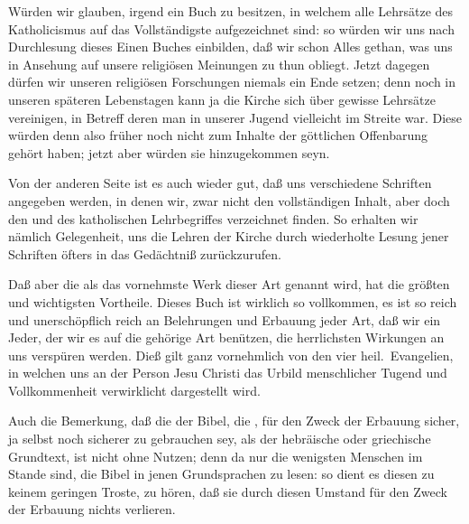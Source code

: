 \begin{aufza}
\item Würden wir glauben, irgend ein Buch zu besitzen, in welchem alle Lehrsätze des Katholicismus auf das Vollständigste aufgezeichnet sind: so würden wir uns nach Durchlesung dieses Einen Buches einbilden, daß wir schon Alles gethan, was uns in Ansehung auf unsere religiösen Meinungen zu thun obliegt. Jetzt dagegen dürfen wir unseren religiösen Forschungen niemals ein Ende setzen; denn noch in unseren späteren Lebenstagen kann ja die Kirche sich über gewisse Lehrsätze vereinigen, in Betreff deren man in unserer Jugend vielleicht im Streite war. Diese würden denn also früher noch nicht zum Inhalte der göttlichen Offenbarung gehört haben; jetzt aber würden sie hinzugekommen seyn.
\item Von der anderen Seite ist es auch wieder gut, daß uns verschiedene Schriften angegeben werden, in denen wir, zwar nicht den vollständigen Inhalt, aber doch den  und  des katholischen Lehrbegriffes verzeichnet finden. So erhalten wir nämlich Gelegenheit, uns die Lehren der Kirche durch wiederholte Lesung jener Schriften öfters in das Gedächtniß zurückzurufen.
\item Daß aber die  als das vornehmste Werk dieser Art genannt wird, hat die größten und wichtigsten Vortheile. Dieses Buch ist wirklich so vollkommen, es ist so reich und unerschöpflich reich an Belehrungen und Erbauung jeder Art, daß wir ein Jeder, der wir es auf die gehörige Art benützen, die herrlichsten Wirkungen an uns verspüren werden. Dieß gilt ganz vornehmlich von den vier heil.\ Evangelien, in welchen uns an der Person Jesu Christi das Urbild menschlicher Tugend und Vollkommenheit verwirklicht dargestellt wird.
\item Auch die Bemerkung, daß die  der Bibel, die , für den Zweck der Erbauung sicher, ja selbst noch sicherer zu gebrauchen sey, als der hebräische oder griechische Grundtext, ist nicht ohne Nutzen; denn da nur die wenigsten Menschen im Stande sind, die Bibel in jenen Grundsprachen zu lesen: so dient es diesen zu keinem geringen Troste, zu hören, daß sie durch diesen Umstand für den Zweck der Erbauung nichts verlieren.
\end{aufza}

